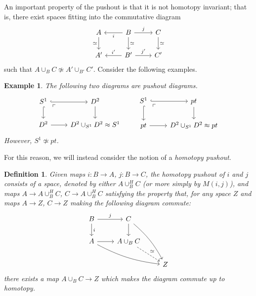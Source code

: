 \documentclass{article}
\newtheorem{definition}[theorem]{Definition}
\newtheorem{example}[theorem]{Example}
\newtheorem{proposed work}[theorem]{Proposed Work}
\begin{document}
An important property of the pushout is that it is not homotopy invariant; that is, there exist spaces fitting into the commutative diagram
\begin{equation*}
\begin{tikzcd}
A \arrow[d,swap, "\simeq"] & B \arrow[l, "i"] \arrow[r, "j"] \arrow[d, "\simeq"]& C \arrow[d, "\simeq"] \\
A' & B' \arrow[l,swap, "i'"] \arrow[r, "j'"] & C'
\end{tikzcd}
\end{equation*}
such that $A \cup_B C \not\simeq A' \cup_{B'} C'$. Consider the following examples.
\begin{example}
The following two diagrams are pushout diagrams.
\begin{equation*}
\begin{tikzcd}
S^1 \arrow[r,hook] \arrow[d,hook] \arrow[dr, phantom, "\ulcorner", very near start] & D^2 \arrow[d] \\
D^2 \arrow[r] & D^2 \cup_{S^1} D^2 \approx S^1
\end{tikzcd} \qquad
\begin{tikzcd}
S^1 \arrow[r,hook] \arrow[d,hook] \arrow[dr, phantom, "\ulcorner", very near start] & pt \arrow[d] \\
pt \arrow[r]& D^2 \cup_{S^1} D^2 \approx pt
\end{tikzcd}
\end{equation*}
However, $S^1 \not\simeq pt$. 
\end{example}

For this reason, we will instead consider the notion of a \emph{homotopy pushout}.

\begin{definition}
Given maps $i : B \to A$, $j: B \to C$, the \emph{homotopy pushout} of $i$ and $j$ consists of a space, denoted by either $A \cup_B^H C$ (or more simply by $M(i,j)$), and maps $A \to A \cup_B^H C$, $C \to A \cup_B^H C$ satisfying the property that, for any space $Z$ and maps $A \to Z$, $C \to Z$ making the following diagram commute:
\begin{equation*}
\begin{tikzcd}
B \arrow[r, "j"] \arrow[d,"i"] & C \arrow[d] \arrow[ddr, bend left=10] \\
A \arrow[r] \arrow[drr, bend right=10] & A \cup_B C \arrow[dashed, "\simeq", dr] \\
& & Z
\end{tikzcd}
\end{equation*}
there exists a map $A \cup_B C \to Z$ which makes the diagram commute up to homotopy.
\end{definition}
\end{document}
